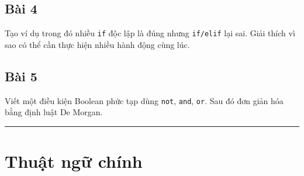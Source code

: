 \documentclass[
  11pt,
  a4paper,
]{article}
\begin{document}
\subsection{Bài 4}\label{buxe0i-4}

Tạo ví dụ trong đó nhiều \texttt{if} độc lập là đúng nhưng
\texttt{if/elif} lại sai. Giải thích vì sao có thể cần thực hiện nhiều
hành động cùng lúc.

\subsection{Bài 5}\label{buxe0i-5}

Viết một điều kiện Boolean phức tạp dùng \texttt{not}, \texttt{and},
\texttt{or}. Sau đó đơn giản hóa bằng định luật De Morgan.

\begin{center}\rule{0.5\linewidth}{0.5pt}\end{center}

\section{Thuật ngữ chính}\label{thuux1eadt-ngux1eef-chuxednh}
\end{document}
